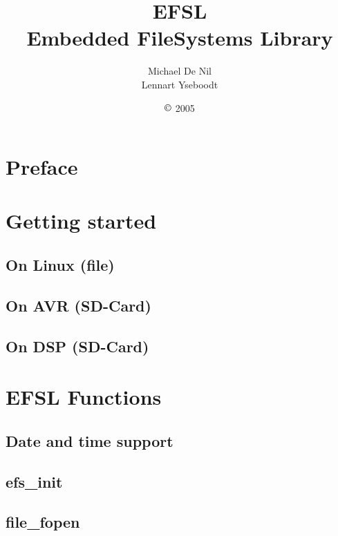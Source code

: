\documentclass[a4paper,fleqn]{article}
\begin{document}
\title{\Huge{EFSL}\\\Large{Embedded FileSystems Library}}
\author{Michael De Nil\\Lennart Yseboodt}
\date{$\copyright$ 2005}
\maketitle

\newpage
\tableofcontents
	
\newpage
\section{Preface}


\newpage
\section{Getting started}
\subsection{On Linux (file)}
	
\newpage
\subsection{On AVR (SD-Card)}
	
\newpage
\subsection{On DSP (SD-Card)}
	
	
\newpage
\section{EFSL Functions}
\subsection{Date and time support}
	
	\newpage
\subsection{efs\_init}
	
	\newpage
\subsection{file\_fopen}
	
	\newpage
\end{document}
